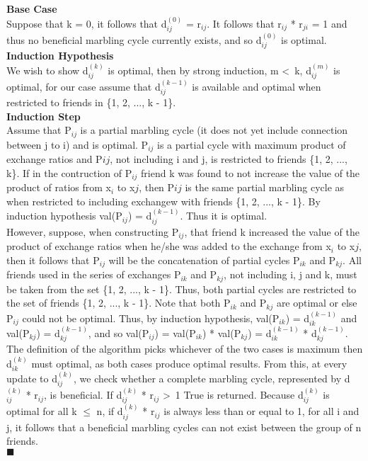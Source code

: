 \documentclass[10pt]{csc_assignment}
\begin{document}
\begin{description}
\textbf{Base Case}\\
Suppose that k = 0, it follows that d$_{ij}^{(0)}$ = r$_{ij}$. It follows that  r$_{ij}$ *  r$_{ji}$ = 1 and thus no beneficial marbling cycle currently exists, and so d$_{ij}^{(0)}$ is optimal.\\
\textbf{Induction Hypothesis}\\
 We wish to show d$_{ij}^{(k)}$ is optimal, then by strong induction, m \textless ~k, d$_{ij}^{(m)}$ is optimal, for our case assume that d$_{ij}^{(k - 1)}$ is available and optimal when restricted to friends in \{1, 2, ..., k - 1\}.\\
\textbf{Induction Step}\\
Assume that P$_{ij}$ is a partial marbling cycle (it does not yet include connection between j to i) and is optimal. P$_{ij}$ is a partial cycle with maximum product of exchange ratios and P${ij}$, not including i and j, is restricted to friends \{1, 2, ..., k\}. If in the contruction of P$_{ij}$ friend k was found to not increase the value of the product of ratios from x$_{i}$ to x${j}$, then P${ij}$ is the same partial marbling cycle as when restricted to including exchangew with friends \{1, 2, ..., k - 1\}. By induction hypothesis val(P$_{ij}$) = d$_{ij}^{(k - 1)}$. Thus it is optimal.\\
However, suppose, when constructing P$_{ij}$, that friend k increased the value of the product of exchange ratios when he/she was added to the exchange from x$_{i}$ to x${j}$, then it follows that P$_{ij}$ will be the concatenation of partial cycles P$_{ik}$ and P$_{kj}$. All friends used in the series of exchanges P$_{ik}$ and P$_{kj}$, not including i, j and k, must be taken from the set \{1, 2, ..., k - 1\}. Thus, both partial cycles are restricted to the set of friends \{1, 2, ..., k - 1\}. Note that both P$_{ik}$ and P$_{kj}$ are optimal or else P$_{ij}$ could not be optimal. Thus, by induction hypothesis, val(P$_{ik}$) = d$_{ik}^{(k - 1)}$ and val(P$_{kj}$) = d$_{kj}^{(k - 1)}$, and so val(P$_{ij}$) = val(P$_{ik}$) * val(P$_{kj}$) = d$_{ik}^{(k - 1)}$ * d$_{kj}^{(k - 1)}$. \\
The definition of the algorithm picks whichever of the two cases is maximum then  d$_{ik}^{(k)}$ must optimal, as both cases produce optimal results. From this, at every update to d$_{ij}^{(k)}$, we check whether a complete marbling cycle, represented by d$_{ij}^{(k)}$ * r$_{ij}$, is beneficial. If d$_{ij}^{(k)}$ * r$_{ij}$ \textgreater ~1 True is returned. Because d$_{ij}^{(k)}$ is optimal for all k $\leqslant$ n, if d$_{ij}^{(k)}$ * r$_{ij}$ is always less than or equal to 1, for all i and j, it follows that a beneficial marbling cycles can not exist between the group of n friends.\\
$\blacksquare$\\


\end{description}
\end{document}
